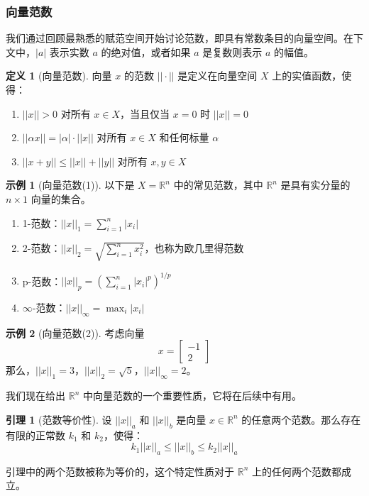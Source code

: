 \documentclass[UTF8,12pt,a4paper]{ctexart}
\theoremstyle{definition}
\newtheorem{definition}{定义}[section]
\newtheorem{lemma}{引理}[section]
\newtheorem{example}{示例}[section]
\begin{document}
\subsubsection{向量范数}

我们通过回顾最熟悉的赋范空间开始讨论范数，即具有常数条目的向量空间。在下文中，$|a|$ 表示实数 $a$ 的绝对值，或者如果 $a$ 是复数则表示 $a$ 的幅值。

\begin{definition}[向量范数]
向量 $x$ 的范数 $||\cdot||$ 是定义在向量空间 $X$ 上的实值函数，使得：
\begin{enumerate}
\item $||x|| > 0$ 对所有 $x \in X$，当且仅当 $x=0$ 时 $||x||=0$
\item $||\alpha x|| = |\alpha| \cdot ||x||$ 对所有 $x \in X$ 和任何标量 $\alpha$
\item $||x+y|| \leq ||x|| + ||y||$ 对所有 $x,y \in X$
\end{enumerate}
\end{definition}

\begin{example}[向量范数(1)]
以下是 $X=\mathbb{R}^n$ 中的常见范数，其中 $\mathbb{R}^n$ 是具有实分量的 $n \times 1$ 向量的集合。
\begin{enumerate}
\item 1-范数：$||x||_1 = \sum_{i=1}^{n} |x_i|$
\item 2-范数：$||x||_2 = \sqrt{\sum_{i=1}^{n} x_i^2}$，也称为欧几里得范数
\item p-范数：$||x||_p = \left(\sum_{i=1}^{n} |x_i|^p\right)^{1/p}$
\item $\infty$-范数：$||x||_\infty = \max_i |x_i|$
\end{enumerate}
\end{example}

\begin{example}[向量范数(2)]
考虑向量
\[
x = \begin{bmatrix} -1 \\ 2 \end{bmatrix}
\]
那么，$||x||_1 = 3$，$||x||_2 = \sqrt{5}$，$||x||_\infty = 2$。
\end{example}

我们现在给出 $\mathbb{R}^n$ 中向量范数的一个重要性质，它将在后续中有用。

\begin{lemma}[范数等价性]
设 $||x||_a$ 和 $||x||_b$ 是向量 $x \in \mathbb{R}^n$ 的任意两个范数。那么存在有限的正常数 $k_1$ 和 $k_2$，使得：
\[
k_1 ||x||_a \leq ||x||_b \leq k_2 ||x||_a
\]
\end{lemma}
引理中的两个范数被称为等价的，这个特定性质对于 $\mathbb{R}^n$ 上的任何两个范数都成立。
\end{document}

